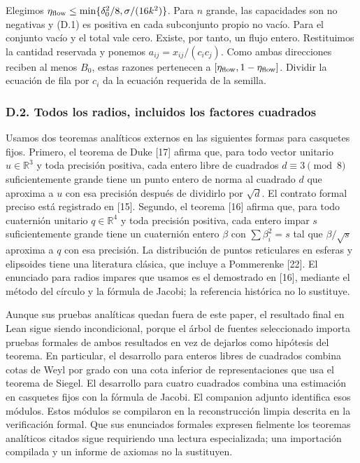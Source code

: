 \documentclass[spanish,11pt,a4paper]{article}
\begin{document}
Elegimos \(\eta_{\rm flow}\le\min\{\delta_0^2/8,\sigma/(16k^2)\}\). Para \(n\) grande, las capacidades son no negativas y (D.1) es positiva en cada subconjunto propio no vacío. Para el conjunto vacío y el total vale cero. Existe, por tanto, un flujo entero. Restituimos la cantidad reservada y ponemos \(a_{ij}=x_{ij}/(c_ic_j)\). Como ambas direcciones reciben al menos \(B_0\), estas razones pertenecen a \([\eta_{\rm flow},1-\eta_{\rm flow}]\). Dividir la ecuación de fila por \(c_i\) da la ecuación requerida de la semilla.

\subsubsection{D.2. Todos los radios, incluidos los factores cuadrados}\label{d.2.-todos-los-radios-incluidos-los-factores-cuadrados}

Usamos dos teoremas analíticos externos en las siguientes formas para casquetes fijos. Primero, el teorema de Duke {[}17{]} afirma que, para todo vector unitario \(u\in\mathbb R^3\) y toda precisión positiva, cada entero libre de cuadrados \(d\equiv3\pmod8\) suficientemente grande tiene un punto entero de norma al cuadrado \(d\) que aproxima a \(u\) con esa precisión después de dividirlo por \(\sqrt d\). El contrato formal preciso está registrado en {[}15{]}. Segundo, el teorema {[}16{]} afirma que, para todo cuaternión unitario \(q\in\mathbb R^4\) y toda precisión positiva, cada entero impar \(s\) suficientemente grande tiene un cuaternión entero \(\beta\) con \(\sum\beta_i^2=s\) tal que \(\beta/\sqrt s\) aproxima a \(q\) con esa precisión. La distribución de puntos reticulares en esferas y elipsoides tiene una literatura clásica, que incluye a Pommerenke {[}22{]}. El enunciado para radios impares que usamos es el demostrado en {[}16{]}, mediante el método del círculo y la fórmula de Jacobi; la referencia histórica no lo sustituye.

Aunque sus pruebas analíticas quedan fuera de este paper, el resultado final en Lean sigue siendo incondicional, porque el árbol de fuentes seleccionado importa pruebas formales de ambos resultados en vez de dejarlos como hipótesis del teorema. En particular, el desarrollo para enteros libres de cuadrados combina cotas de Weyl por grado con una cota inferior de representaciones que usa el teorema de Siegel. El desarrollo para cuatro cuadrados combina una estimación en casquetes fijos con la fórmula de Jacobi. El companion adjunto identifica esos módulos. Estos módulos se compilaron en la reconstrucción limpia descrita en la verificación formal. Que sus enunciados formales expresen fielmente los teoremas analíticos citados sigue requiriendo una lectura especializada; una importación compilada y un informe de axiomas no la sustituyen.
\end{document}
